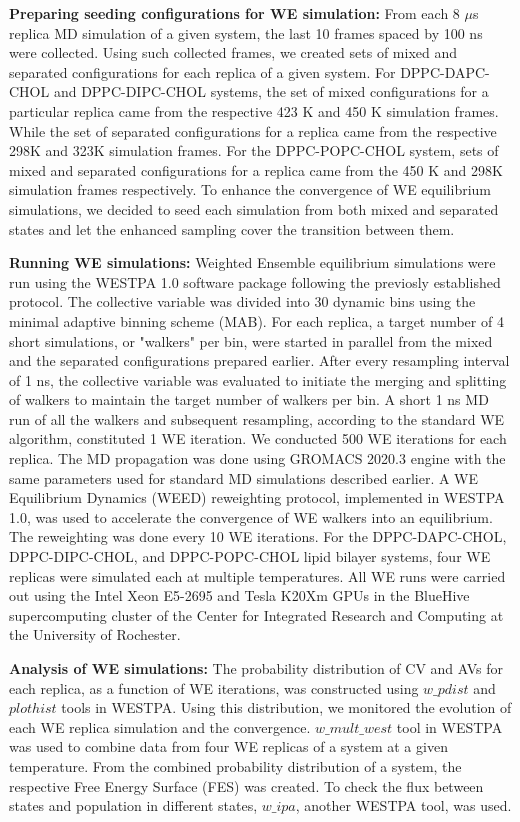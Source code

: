 \documentclass{biophys-new}
\begin{document}
\textbf{Preparing seeding configurations for WE simulation:} 
From each 8 $\mu$s replica MD simulation of a given system, the last 10 frames spaced by 100 ns were collected.
Using such collected frames, we created sets of mixed and separated configurations for each replica of a given system.
For DPPC-DAPC-CHOL and DPPC-DIPC-CHOL systems, the set of mixed configurations for a particular replica came from the respective 423 K and 450 K simulation frames. 
While the set of separated configurations for a replica came from  the respective 298K and 323K simulation frames.
For the DPPC-POPC-CHOL system, sets of mixed and separated configurations for a replica came from the 450 K and 298K simulation frames respectively.
To enhance the convergence of WE equilibrium simulations, we decided to seed each simulation from both mixed and separated states and let the enhanced sampling cover the transition between them.

\textbf{Running WE simulations:} 
Weighted Ensemble equilibrium simulations were run using the WESTPA 1.0 software package\cite{Zwier2015} following the previosly established protocol\cite{Bogetti2019}.
The collective variable was divided into 30 dynamic bins using the minimal adaptive binning scheme (MAB)\cite{Torrillo2021}.
For each replica, a target number of 4 short simulations, or "walkers" per bin, were started in parallel from the mixed and the separated configurations prepared earlier.
After every resampling interval of 1 ns, the collective variable was evaluated to initiate the merging and splitting of walkers to maintain the target number of walkers per bin.
A short 1 ns MD run of all the walkers and subsequent resampling, according to the standard WE algorithm, constituted 1 WE iteration. 
We conducted 500 WE iterations for each replica.
The MD propagation was done using GROMACS 2020.3 engine with the same parameters used for standard MD simulations described earlier.
A WE Equilibrium Dynamics (WEED) reweighting protocol\cite{Bhatt2010,Suarez2014}, implemented in WESTPA 1.0, was used to accelerate the convergence of WE walkers into an equilibrium. 
The reweighting was done every 10 WE iterations.
For the DPPC-DAPC-CHOL, DPPC-DIPC-CHOL, and DPPC-POPC-CHOL lipid bilayer systems, four WE replicas were simulated each at multiple temperatures. 
All WE runs were carried out using the Intel Xeon E5-2695 and Tesla K20Xm GPUs in the BlueHive supercomputing cluster of the Center for Integrated Research and
Computing at the University of Rochester.   

\textbf{Analysis of WE simulations:}
The probability distribution of CV and AVs for each replica, as a function of WE iterations, was constructed using $w\_pdist$ and $plothist$ tools in WESTPA.
Using this distribution, we monitored the evolution of each WE replica simulation and the convergence.
$w\_mult\_west$ tool in WESTPA was used to combine data from four WE replicas of a system at a given temperature.
From the combined probability distribution of a system, the respective Free Energy Surface (FES) was created.
To check the flux between states and population in different states, $w\_ipa$, another WESTPA tool, was used.
\end{document}
